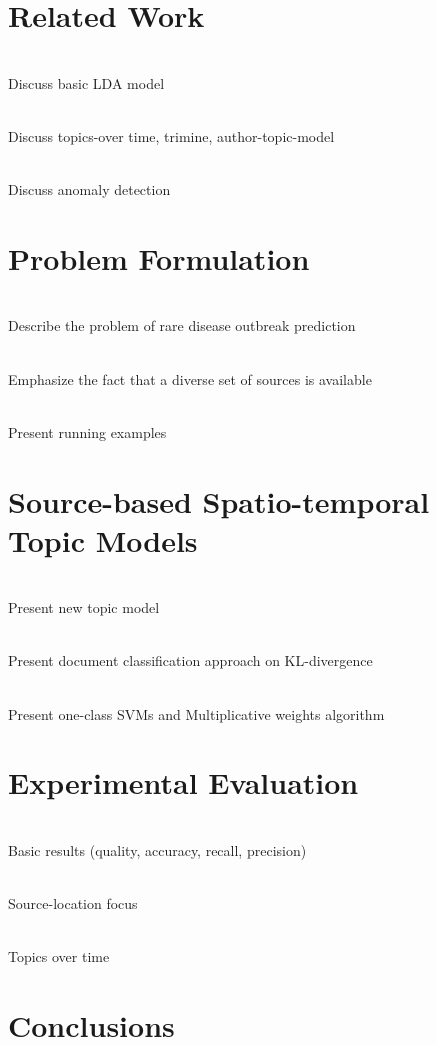 \documentclass{sig-alternate}
\begin{document}
\section{Related Work}

\ \\Discuss basic LDA model

\ \\Discuss topics-over time, trimine, author-topic-model

\ \\Discuss anomaly detection

\section{Problem Formulation}

\ \\Describe the problem of rare disease outbreak prediction

\ \\Emphasize the fact that a diverse set of sources is available

\ \\Present running examples

\section{Source-based Spatio-temporal \\Topic Models}

\ \\Present new topic model

\ \\Present document classification approach on KL-divergence

\ \\Present one-class SVMs and Multiplicative weights algorithm

\section{Experimental Evaluation}

\ \\Basic results (quality, accuracy, recall, precision)

\ \\Source-location focus

\ \\Topics over time

\section{Conclusions}



\end{document}
